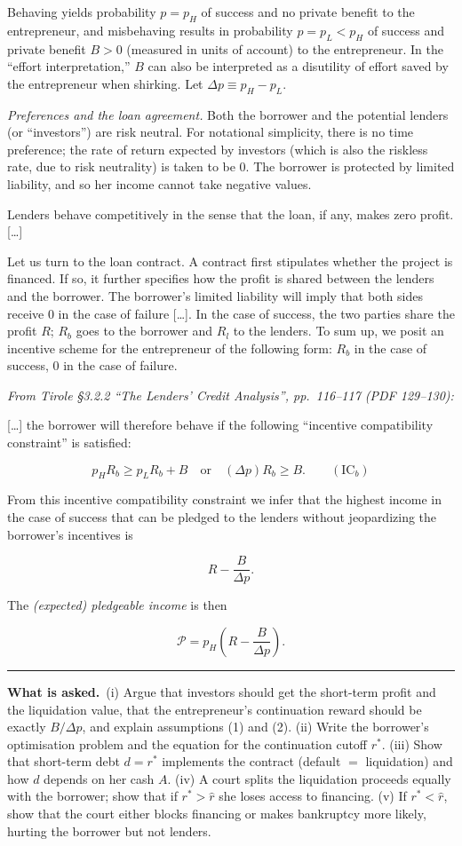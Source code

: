 \documentclass[11pt,a4paper]{article}
\newcommand{\asked}{\par\medskip\noindent\textbf{What is asked.}~}
\newcommand{\stmtend}{\par\endgroup\nopagebreak\noindent\rule{\linewidth}{0.4pt}\par\medskip}
\begin{document}
Behaving yields probability \(p = p_H\) of success and no private benefit to the entrepreneur, and
misbehaving results in probability \(p = p_L < p_H\) of success and private benefit \(B > 0\)
(measured in units of account) to the entrepreneur. In the ``effort interpretation,'' \(B\) can also
be interpreted as a disutility of effort saved by the entrepreneur when shirking. Let
\(\Delta p \equiv p_H - p_L\).

\emph{Preferences and the loan agreement.} Both the borrower and the potential lenders (or
``investors'') are risk neutral. For notational simplicity, there is no time preference; the rate of
return expected by investors (which is also the riskless rate, due to risk neutrality) is taken to
be 0. The borrower is protected by limited liability, and so her income cannot take negative values.

Lenders behave competitively in the sense that the loan, if any, makes zero profit. {[}\ldots{]}

Let us turn to the loan contract. A contract first stipulates whether the project is financed. If
so, it further specifies how the profit is shared between the lenders and the borrower. The
borrower's limited liability will imply that both sides receive 0 in the case of failure
{[}\ldots{]}. In the case of success, the two parties share the profit \(R\); \(R_b\) goes to the
borrower and \(R_l\) to the lenders. To sum up, we posit an incentive scheme for the entrepreneur of
the following form: \(R_b\) in the case of success, 0 in the case of failure.

\emph{From Tirole §3.2.2 ``The Lenders' Credit Analysis'', pp.~116--117 (PDF 129--130):}

{[}\ldots{]} the borrower will therefore behave if the following ``incentive compatibility
constraint'' is satisfied:

\[p_H R_b \geqslant p_L R_b + B \quad \text{or} \quad (\Delta p) R_b \geqslant B. \qquad (\text{IC}_b)\]

From this incentive compatibility constraint we infer that the highest income in the case of success
that can be pledged to the lenders without jeopardizing the borrower's incentives is

\[R - \frac{B}{\Delta p}.\]

The \emph{(expected) pledgeable income} is then

\[\mathcal{P} = p_H\left(R - \frac{B}{\Delta p}\right).\]
\stmtend

\asked (i) Argue that investors should get the short-term profit and the liquidation value, that
the entrepreneur's continuation reward should be exactly $B/\Delta p$, and explain assumptions (1)
and (2). (ii) Write the borrower's optimisation problem and the equation for the continuation cutoff
$r^*$. (iii) Show that short-term debt $d=r^*$ implements the contract (default $=$ liquidation) and
how $d$ depends on her cash $A$. (iv) A court splits the liquidation proceeds equally with the
borrower; show that if $r^*>\hat r$ she loses access to financing. (v) If $r^*<\hat r$, show that the
court either blocks financing or makes bankruptcy more likely, hurting the borrower but not lenders.
\end{document}
